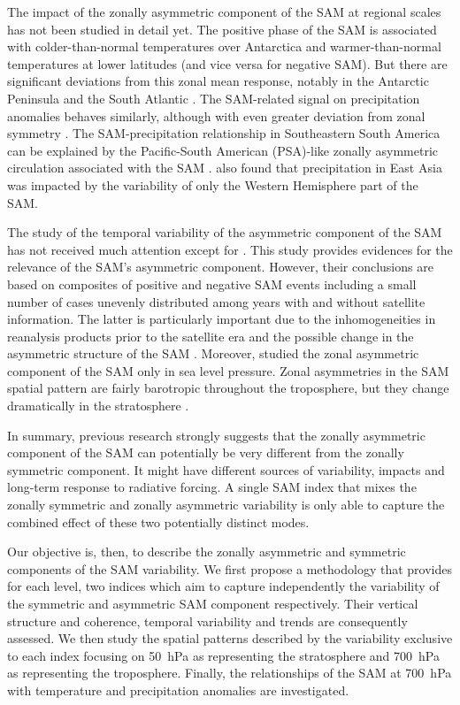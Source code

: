 \documentclass[smallextended]{svjour3}       %
\begin{document}
The impact of the zonally asymmetric component of the SAM at regional scales has not been studied in detail yet.
The positive phase of the SAM is associated with colder-than-normal temperatures over Antarctica and warmer-than-normal temperatures at lower latitudes \citep{jones2019} (and vice versa for negative SAM).
But there are significant deviations from this zonal mean response, notably in the Antarctic Peninsula and the South Atlantic \citep{fogt2012}.
The SAM-related signal on precipitation anomalies behaves similarly, although with even greater deviation from zonal symmetry \citep{lim2016}.
The SAM-precipitation relationship in Southeastern South America can be explained by the Pacific-South American (PSA)-like zonally asymmetric circulation associated with the SAM \citep{silvestri2009, rosso2018}.
\citet{fan2007} also found that precipitation in East Asia was impacted by the variability of only the Western Hemisphere part of the SAM.

The study of the temporal variability of the asymmetric component of the SAM has not received much attention except for \citet{fogt2012}.
This study provides evidences for the relevance of the SAM's asymmetric component.
However, their conclusions are based on composites of positive and negative SAM events including a small number of cases unevenly distributed among years with and without satellite information.
The latter is particularly important due to the inhomogeneities in reanalysis products prior to the satellite era and the possible change in the asymmetric structure of the SAM \citep{silvestri2009}.
Moreover, \citet{fogt2012} studied the zonal asymmetric component of the SAM only in sea level pressure.
Zonal asymmetries in the SAM spatial pattern are fairly barotropic throughout the troposphere, but they change dramatically in the stratosphere \citep{baldwin2009}.

In summary, previous research strongly suggests that the zonally asymmetric component of the SAM can potentially be very different from the zonally symmetric component.
It might have different sources of variability, impacts and long-term response to radiative forcing.
A single SAM index that mixes the zonally symmetric and zonally asymmetric variability is only able to capture the combined effect of these two potentially distinct modes.

Our objective is, then, to describe the zonally asymmetric and symmetric components of the SAM variability.
We first propose a methodology that provides for each level, two indices which aim to capture independently the variability of the symmetric and asymmetric SAM component respectively.
Their vertical structure and coherence, temporal variability and trends are consequently assessed.
We then study the spatial patterns described by the variability exclusive to each index focusing on 50~hPa as representing the stratosphere and 700~hPa as representing the troposphere.
Finally, the relationships of the SAM at 700~hPa with temperature and precipitation anomalies are investigated.
\end{document}
